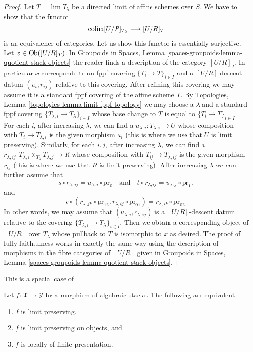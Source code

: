 \begin{proof}
\medskip\noindent
Let $T = \lim T_\lambda$ be a directed limit of affine schemes over $S$.
We have to show that the functor
$$
\mathop{\mathrm{colim}}\nolimits [U/R]_{T_\lambda} \longrightarrow [U/R]_T
$$
is an equivalence of categories. Let us show this functor is
essentially surjective. Let $x \in \mathop{\mathrm{Ob}}\nolimits([U/R]_T)$. In
Groupoids in Spaces, Lemma \ref{spaces-groupoids-lemma-quotient-stack-objects}
the reader finds a description of the category $[U/R]_T$.
In particular $x$ corresponds to an fppf covering
$\{T_i \to T\}_{i \in I}$ and a $[U/R]$-descent datum
$(u_i, r_{ij})$ relative to this covering.
After refining this covering we may assume it is a standard
fppf covering of the affine scheme $T$.
By Topologies, Lemma
\ref{topologies-lemma-limit-fppf-topology}
we may choose a $\lambda$ and a standard fppf covering
$\{T_{\lambda, i} \to T_\lambda\}_{i \in I}$ whose base change to $T$
is equal to $\{T_i \to T\}_{i \in I}$.
For each $i$, after increasing $\lambda$, we can find
a $u_{\lambda, i} : T_{\lambda, i} \to U$ whose composition
with $T_i \to T_{\lambda, i}$ is the given morphism $u_i$
(this is where we use that $U$ is limit preserving).
Similarly, for each $i, j$, after increasing $\lambda$, we can find
a $r_{\lambda, ij} : T_{\lambda, i} \times_{T_\lambda} T_{\lambda, j} \to R$
whose composition with $T_{ij} \to T_{\lambda, ij}$ is the given morphism
$r_{ij}$ (this is where we use that $R$ is limit preserving).
After increasing $\lambda$ we can further assume that
$$
s \circ r_{\lambda, ij} = u_{\lambda, i} \circ \text{pr}_0
\quad\text{and}\quad
t \circ r_{\lambda, ij} = u_{\lambda, j} \circ \text{pr}_1,
$$
and
$$
c \circ (r_{\lambda, jk} \circ \text{pr}_{12}, r_{\lambda, ij}
\circ \text{pr}_{01}) = r_{\lambda, ik} \circ \text{pr}_{02}.
$$
In other words, we may assume that $(u_{\lambda, i}, r_{\lambda, ij})$
is a $[U/R]$-descent datum relative to the covering
$\{T_{\lambda, i} \to T_\lambda\}_{i \in I}$.
Then we obtain a corresponding object of $[U/R]$ over $T_\lambda$
whose pullback to $T$ is isomorphic to $x$ as desired.
The proof of fully faithfulness works in exactly the same
way using the description of morphisms
in the fibre categories of $[U/R]$ given in
Groupoids in Spaces, Lemma \ref{spaces-groupoids-lemma-quotient-stack-objects}.
\end{proof}

\begin{proposition}
\label{proposition-characterize-locally-finite-presentation}
\begin{reference}
This is a special case of \cite[Lemma 2.3.15]{Emerton-Gee}
\end{reference}
Let $f : \mathcal{X} \to \mathcal{Y}$ be a morphism of algebraic stacks.
The following are equivalent
\begin{enumerate}
\item $f$ is limit preserving,
\item $f$ is limit preserving on objects, and
\item $f$ is locally of finite presentation.
\end{enumerate}
\end{proposition}

